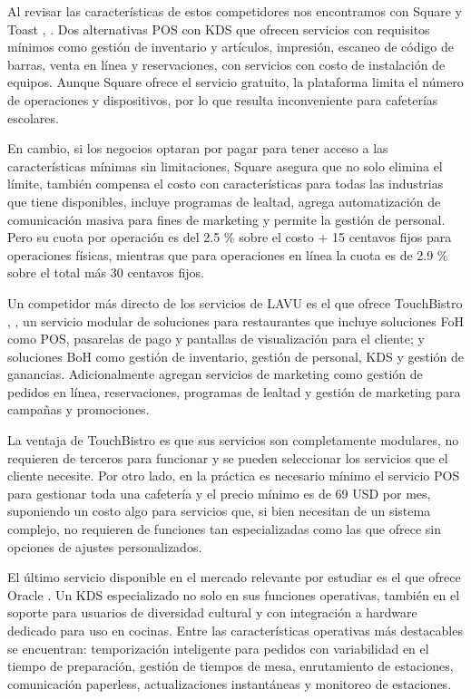 Al revisar las características de estos competidores nos encontramos con Square y Toast \cite{block2026square}, \cite{toast2026opciones}. Dos alternativas POS con KDS que ofrecen servicios con requisitos mínimos como gestión de inventario y artículos, impresión, escaneo de código de barras, venta en línea y reservaciones, con servicios con costo de instalación de equipos. Aunque Square ofrece el servicio gratuito, la plataforma limita el número de operaciones y dispositivos, por lo que resulta inconveniente para cafeterías escolares.

En cambio, si los negocios optaran por pagar para tener acceso a las características mínimas sin limitaciones, Square asegura que no solo elimina el límite, también compensa el costo con características para todas las industrias que tiene disponibles, incluye programas de lealtad, agrega automatización de comunicación masiva para fines de marketing y permite la gestión de personal. Pero su cuota por operación es del 2.5 \% sobre el costo + 15 centavos fijos para operaciones físicas, mientras que para operaciones en línea la cuota es de 2.9 \% sobre el total más 30 centavos fijos.

Un competidor más directo de los servicios de LAVU es el que ofrece TouchBistro \cite{lavi2026lavu}, \cite{touchbistro2026pricing}, un servicio modular de soluciones para restaurantes que incluye soluciones FoH como POS, pasarelas de pago y pantallas de visualización para el cliente; y soluciones BoH como gestión de inventario, gestión de personal, KDS y gestión de ganancias. Adicionalmente agregan servicios de marketing como gestión de pedidos en línea, reservaciones, programas de lealtad y gestión de marketing para campañas y promociones.

La ventaja de TouchBistro es que sus servicios son completamente modulares, no requieren de terceros para funcionar y se pueden seleccionar los servicios que el cliente necesite. Por otro lado, en la práctica es necesario mínimo el servicio POS para gestionar toda una cafetería y el precio mínimo es de 69 USD por mes, suponiendo un costo algo para servicios que, si bien necesitan de un sistema complejo, no requieren de funciones tan especializadas como las que ofrece sin opciones de ajustes personalizados. 

El último servicio disponible en el mercado relevante por estudiar es el que ofrece Oracle \cite{oracle2020micros}. Un KDS especializado no solo en sus funciones operativas, también en el soporte para usuarios de diversidad cultural y con integración a hardware dedicado para uso en cocinas. Entre las características operativas más destacables se encuentran: temporización inteligente para pedidos con variabilidad en el tiempo de preparación, gestión de tiempos de mesa, enrutamiento de estaciones, comunicación paperless, actualizaciones instantáneas y monitoreo de estaciones.

